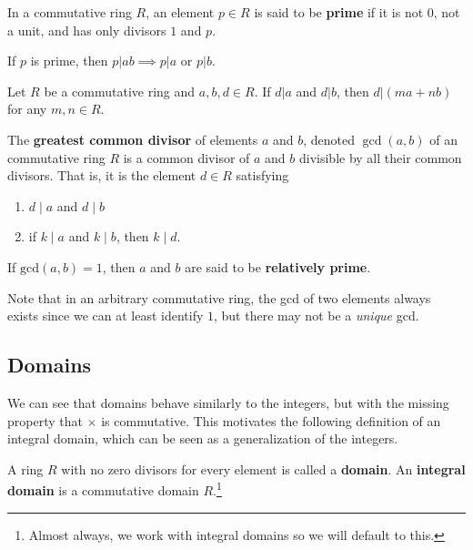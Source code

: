   \begin{definition}
    In a commutative ring $R$, an element $p \in R$ is said to be \textbf{prime} if it is not $0$, not a unit, and has only divisors $1$ and $p$. 
  \end{definition}

  \begin{lemma}[Euclid]
    If $p$ is prime, then $p|ab \implies p|a$ or $p|b$.  
  \end{lemma}

  \begin{lemma} 
    Let $R$ be a commutative ring and $a, b, d \in R$. If $d|a$ and $d|b$, then $d | (ma + nb)$ for any $m, n \in R$. 
  \end{lemma} 

  \begin{definition}
    The \textbf{greatest common divisor} of elements $a$ and $b$, denoted $\gcd(a, b)$ of an commutative ring $R$ is a common divisor of $a$ and $b$ divisible by all their common divisors. That is, it is the element $d \in R$ satisfying 
    \begin{enumerate}
      \item $d \mid a$ and $d \mid b$ 
      \item if $k \mid a$ and $k \mid b$, then $k \mid d$. 
    \end{enumerate}
    If $\mathrm{gcd}(a, b) = 1$, then $a$ and $b$ are said to be \textbf{relatively prime}. 
  \end{definition} 

  Note that in an arbitrary commutative ring, the gcd of two elements always exists since we can at least identify $1$, but there may not be a \textit{unique} gcd. 

\subsection{Domains}

  We can see that domains behave similarly to the integers, but with the missing property that $\times$ is commutative. This motivates the following definition of an integral domain, which can be seen as a generalization of the integers. 

  \begin{definition}[Domain]
    A ring $R$ with no zero divisors for every element is called a \textbf{domain}. An \textbf{integral domain} is a commutative domain $R$.\footnote{Almost always, we work with integral domains so we will default to this.} 
  \end{definition} 

